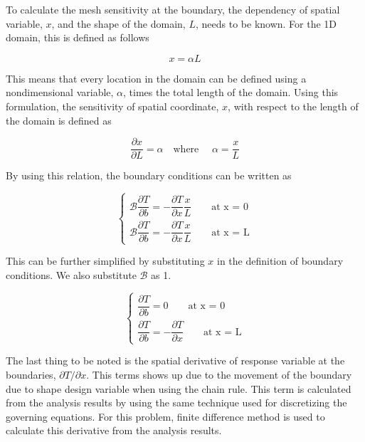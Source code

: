 To calculate the mesh sensitivity at the boundary, the dependency of spatial variable, $x$, and the shape of the domain, $L$, needs to be known. For the 1D domain, this is defined as follows

\begin{equation*}
	x = \alpha L
\end{equation*}

This means that every location in the domain can be defined using a nondimensional variable, $\alpha$, times the total length of the domain. Using this formulation, the sensitivity of spatial coordinate, $x$, with respect to the length of the domain is defined as

\begin{equation*}
	\frac{\partial x}{\partial L} = \alpha \quad \text{where } \quad \alpha = \frac{x}{L}
\end{equation*}

By using this relation, the boundary conditions can be written as

\begin{equation*}
\begin{cases}
	\mathcal{B} \dfrac{\partial T}{\partial b} = -\dfrac{\partial T}{\partial x} \dfrac{x}{L} \qquad \text{at x = 0}
	\\
	\mathcal{B} \dfrac{\partial T}{\partial b} = -\dfrac{\partial T}{\partial x} \dfrac{x}{L} \qquad \text{at x = L}
\end{cases}
\end{equation*}

This can be further simplified by substituting $x$ in the definition of boundary conditions. We also substitute $\mathcal{B}$ as 1.

\begin{equation}\label{eq:C2_laplaceSAboundaryCondition}
\begin{cases}
	\dfrac{\partial T}{\partial b} = 0 \qquad \text{at x = 0}
	\\
	\dfrac{\partial T}{\partial b} = -\dfrac{\partial T}{\partial x} \qquad \text{at x = L}
\end{cases}
\end{equation}

The last thing to be noted is the spatial derivative of response variable at the boundaries, $\partial T/\partial x$. This terms shows up due to the movement of the boundary due to shape design variable when using the chain rule. This term is calculated from the analysis results by using the same technique used for discretizing the governing equations. For this problem, finite difference method is used to calculate this derivative from the analysis results.

